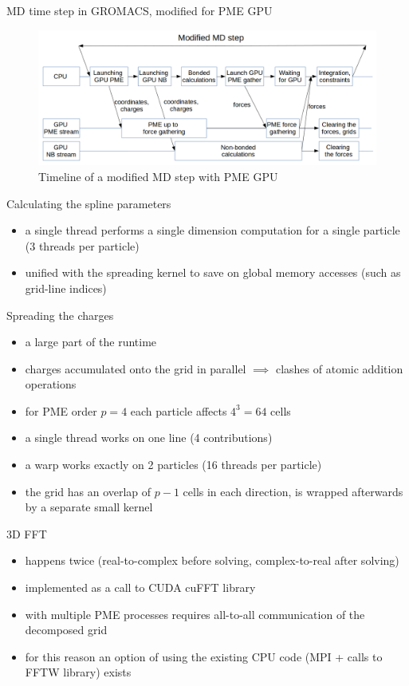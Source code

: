 \documentclass[11pt]{beamer}
\begin{document}
\begin{frame}{MD time step in GROMACS, modified for PME GPU}
\begin{figure}
    \centering
    \includegraphics[width=1\textwidth]{pics/mdstep-gpu.png}
    \caption{Timeline of a modified MD step with PME GPU}
\end{figure}
\FloatBarrier
\end{frame}

\begin{frame}{Calculating the spline parameters}
\begin{itemize}
\item a single thread performs a single dimension computation for a single particle (3 threads per particle)
\item unified with the spreading kernel to save on global memory accesses (such as grid-line indices) 
\end{itemize}
\end{frame}

\begin{frame}{Spreading the charges}
\begin{itemize}
\item a large part of the runtime
\item charges accumulated onto the grid in parallel $\implies$ clashes of atomic 
addition operations
\item for PME order $p=4$ each particle affects $4^3 = 64$ cells
\item a single thread works on one line (4 contributions)
\item a warp works exactly on 2 particles (16 threads per particle)
\item the grid has an overlap of $p - 1$ cells in each direction, is wrapped afterwards by a separate small kernel 
\end{itemize}
\end{frame}

\begin{frame}{3D FFT}
\begin{itemize}
\item happens twice (real-to-complex before solving, complex-to-real after solving)
\item implemented as a call to CUDA cuFFT library
\item with multiple PME processes requires all-to-all communication of the decomposed grid
\item for this reason an option of using the existing CPU code (MPI + calls to FFTW library) exists
\end{itemize}
\end{frame}
\end{document}
